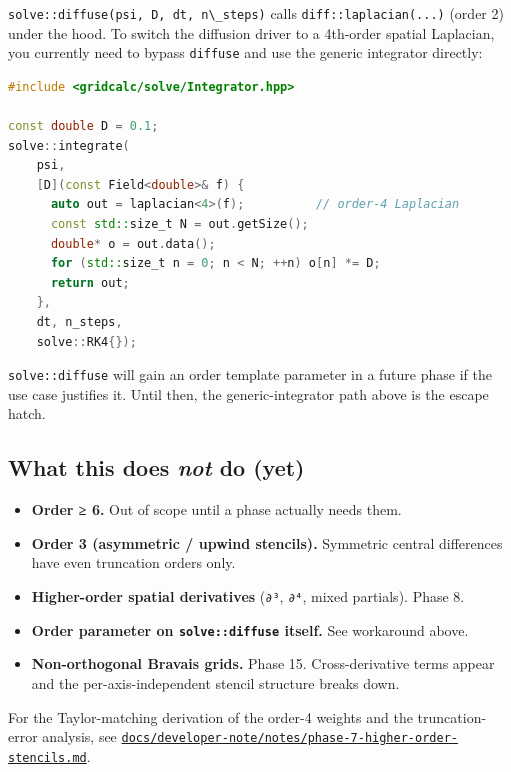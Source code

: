 \passthrough{\lstinline!solve::diffuse(psi, D, dt, n\_steps)!} calls
\passthrough{\lstinline!diff::laplacian(...)!} (order 2) under the hood.
To switch the diffusion driver to a 4th-order spatial Laplacian, you
currently need to bypass \passthrough{\lstinline!diffuse!} and use the
generic integrator directly:

\begin{lstlisting}[language={C++}]
#include <gridcalc/solve/Integrator.hpp>

const double D = 0.1;
solve::integrate(
    psi,
    [D](const Field<double>& f) {
      auto out = laplacian<4>(f);          // order-4 Laplacian
      const std::size_t N = out.getSize();
      double* o = out.data();
      for (std::size_t n = 0; n < N; ++n) o[n] *= D;
      return out;
    },
    dt, n_steps,
    solve::RK4{});
\end{lstlisting}

\passthrough{\lstinline!solve::diffuse!} will gain an order template
parameter in a future phase if the use case justifies it. Until then,
the generic-integrator path above is the escape hatch.

\subsection{\texorpdfstring{What this does \emph{not} do
(yet)}{What this does not do (yet)}}\label{what-this-does-not-do-yet}

\begin{itemize}
\tightlist
\item
  \textbf{Order ≥ 6.} Out of scope until a phase actually needs them.
\item
  \textbf{Order 3 (asymmetric / upwind stencils).} Symmetric central
  differences have even truncation orders only.
\item
  \textbf{Higher-order spatial derivatives}
  (\passthrough{\lstinline!∂³!}, \passthrough{\lstinline!∂⁴!}, mixed
  partials). Phase 8.
\item
  \textbf{Order parameter on \passthrough{\lstinline!solve::diffuse!}
  itself.} See workaround above.
\item
  \textbf{Non-orthogonal Bravais grids.} Phase 15. Cross-derivative
  terms appear and the per-axis-independent stencil structure breaks
  down.
\end{itemize}

For the Taylor-matching derivation of the order-4 weights and the
truncation-error analysis, see
\href{../../developer-note/notes/phase-7-higher-order-stencils.md}{\passthrough{\lstinline!docs/developer-note/notes/phase-7-higher-order-stencils.md!}}.
